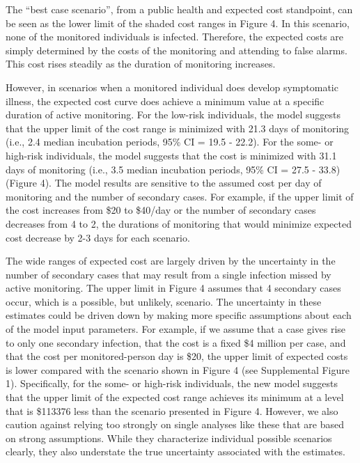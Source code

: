 \documentclass[]{article}
\begin{document}
The ``best case scenario'', from a public health and expected cost
standpoint, can be seen as the lower limit of the shaded cost ranges in
Figure 4. In this scenario, none of the monitored individuals is
infected. Therefore, the expected costs are simply determined by the
costs of the monitoring and attending to false alarms. This cost rises
steadily as the duration of monitoring increases.

However, in scenarios when a monitored individual does develop
symptomatic illness, the expected cost curve does achieve a minimum
value at a specific duration of active monitoring. For the low-risk
individuals, the model suggests that the upper limit of the cost range
is minimized with 21.3 days of monitoring (i.e., 2.4 median incubation
periods, 95\% CI = 19.5 - 22.2). For the some- or high-risk individuals,
the model suggests that the cost is minimized with 31.1 days of
monitoring (i.e., 3.5 median incubation periods, 95\% CI = 27.5 - 33.8)
(Figure 4). The model results are sensitive to the assumed cost per day
of monitoring and the number of secondary cases. For example, if the
upper limit of the cost increases from \$20 to \$40/day or the number of
secondary cases decreases from 4 to 2, the durations of monitoring that
would minimize expected cost decrease by 2-3 days for each scenario.

The wide ranges of expected cost are largely driven by the uncertainty
in the number of secondary cases that may result from a single infection
missed by active monitoring. The upper limit in Figure 4 assumes that 4
secondary cases occur, which is a possible, but unlikely, scenario. The
uncertainty in these estimates could be driven down by making more
specific assumptions about each of the model input parameters. For
example, if we assume that a case gives rise to only one secondary
infection, that the cost is a fixed \$4 million per case, and that the
cost per monitored-person day is \$20, the upper limit of expected costs
is lower compared with the scenario shown in Figure 4 (see Supplemental
Figure 1). Specifically, for the some- or high-risk individuals, the new
model suggests that the upper limit of the expected cost range achieves
its minimum at a level that is \$113376 less than the scenario presented
in Figure 4. However, we also caution against relying too strongly on
single analyses like these that are based on strong assumptions. While
they characterize individual possible scenarios clearly, they also
understate the true uncertainty associated with the estimates.
\end{document}
